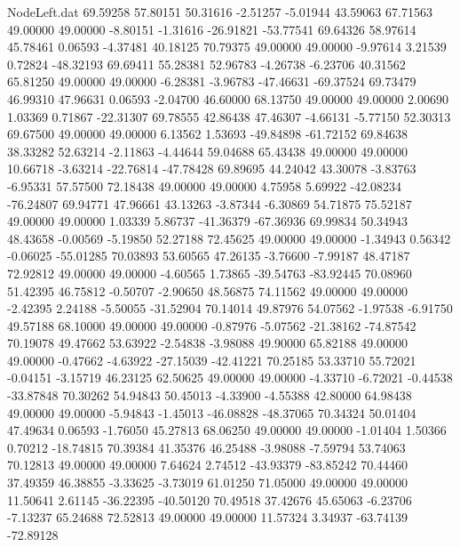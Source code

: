 \begin{filecontents}{NodeLeft.dat}
  69.59258   57.80151   50.31616    -2.51257   -5.01944   43.59063   67.71563   49.00000   49.00000   -8.80151   -1.31616  -26.91821  -53.77541
  69.64326   58.97614   45.78461     0.06593   -4.37481   40.18125   70.79375   49.00000   49.00000   -9.97614    3.21539    0.72824  -48.32193
  69.69411   55.28381   52.96783    -4.26738   -6.23706   40.31562   65.81250   49.00000   49.00000   -6.28381   -3.96783  -47.46631  -69.37524
  69.73479   46.99310   47.96631     0.06593   -2.04700   46.60000   68.13750   49.00000   49.00000    2.00690    1.03369    0.71867  -22.31307
  69.78555   42.86438   47.46307    -4.66131   -5.77150   52.30313   69.67500   49.00000   49.00000    6.13562    1.53693  -49.84898  -61.72152
  69.84638   38.33282   52.63214    -2.11863   -4.44644   59.04688   65.43438   49.00000   49.00000   10.66718   -3.63214  -22.76814  -47.78428
  69.89695   44.24042   43.30078    -3.83763   -6.95331   57.57500   72.18438   49.00000   49.00000    4.75958    5.69922  -42.08234  -76.24807
  69.94771   47.96661   43.13263    -3.87344   -6.30869   54.71875   75.52187   49.00000   49.00000    1.03339    5.86737  -41.36379  -67.36936
  69.99834   50.34943   48.43658    -0.00569   -5.19850   52.27188   72.45625   49.00000   49.00000   -1.34943    0.56342   -0.06025  -55.01285
  70.03893   53.60565   47.26135    -3.76600   -7.99187   48.47187   72.92812   49.00000   49.00000   -4.60565    1.73865  -39.54763  -83.92445
  70.08960   51.42395   46.75812    -0.50707   -2.90650   48.56875   74.11562   49.00000   49.00000   -2.42395    2.24188   -5.50055  -31.52904
  70.14014   49.87976   54.07562    -1.97538   -6.91750   49.57188   68.10000   49.00000   49.00000   -0.87976   -5.07562  -21.38162  -74.87542
  70.19078   49.47662   53.63922    -2.54838   -3.98088   49.90000   65.82188   49.00000   49.00000   -0.47662   -4.63922  -27.15039  -42.41221
  70.25185   53.33710   55.72021    -0.04151   -3.15719   46.23125   62.50625   49.00000   49.00000   -4.33710   -6.72021   -0.44538  -33.87848
  70.30262   54.94843   50.45013    -4.33900   -4.55388   42.80000   64.98438   49.00000   49.00000   -5.94843   -1.45013  -46.08828  -48.37065
  70.34324   50.01404   47.49634     0.06593   -1.76050   45.27813   68.06250   49.00000   49.00000   -1.01404    1.50366    0.70212  -18.74815
  70.39384   41.35376   46.25488    -3.98088   -7.59794   53.74063   70.12813   49.00000   49.00000    7.64624    2.74512  -43.93379  -83.85242
  70.44460   37.49359   46.38855    -3.33625   -3.73019   61.01250   71.05000   49.00000   49.00000   11.50641    2.61145  -36.22395  -40.50120
  70.49518   37.42676   45.65063    -6.23706   -7.13237   65.24688   72.52813   49.00000   49.00000   11.57324    3.34937  -63.74139  -72.89128

\end{filecontents}
